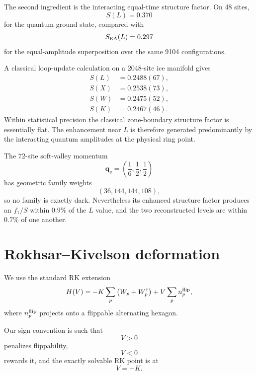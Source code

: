 \documentclass[
aps,
prl,
onecolumn,
amsmath,
amssymb,
superscriptaddress,
longbibliography
]{revtex4-2}
\newcommand{\bq}{\bm q}
\begin{document}
The second ingredient is the interacting equal-time structure factor.
On 48 sites,
\begin{equation}
S(L)=0.370
\end{equation}
for the quantum ground state, compared with
\begin{equation}
S_{\rm EA}(L)=0.297
\end{equation}
for the equal-amplitude superposition over the same 9104
configurations.

A classical loop-update calculation on a 2048-site ice manifold gives
\begin{align}
S(L)&=0.2488(67),\\
S(X)&=0.2538(73),\\
S(W)&=0.2475(52),\\
S(K)&=0.2467(46).
\end{align}
Within statistical precision the classical zone-boundary structure
factor is essentially flat.
The enhancement near $L$ is therefore generated predominantly by the
interacting quantum amplitudes at the physical ring point.

The 72-site soft-valley momentum
\begin{equation}
\bq_v
=
\left(
\frac16,\frac12,\frac12
\right)
\end{equation}
has geometric family weights
\begin{equation}
(36,144,144,108),
\end{equation}
so no family is exactly dark.
Nevertheless its enhanced structure factor produces an $f_1/S$
within $0.9\%$ of the $L$ value, and the two reconstructed levels are
within $0.7\%$ of one another.

\section{Rokhsar--Kivelson deformation}
\label{sec:rk}

We use the standard RK extension
\begin{equation}
H(V)
=
-K\sum_p
\left(
W_p+W_p^\dagger
\right)
+
V\sum_p n_p^{\rm flip},
\label{eq:rk_supp}
\end{equation}
where $n_p^{\rm flip}$ projects onto a flippable alternating
hexagon.

Our sign convention is such that
\begin{equation}
V>0
\end{equation}
penalizes flippability,
\begin{equation}
V<0
\end{equation}
rewards it, and the exactly solvable RK point is at
\begin{equation}
V=+K.
\end{equation}
\end{document}
